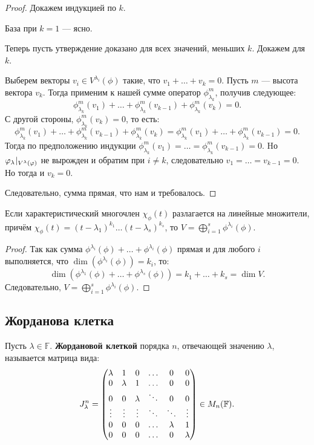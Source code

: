 \begin{proof}
	Докажем индукцией по $k$.
	
	База при $k = 1$ --- ясно.
	
	Теперь пусть утверждение доказано для всех значений, меньших $k$. Докажем для $k$.
	
	Выберем векторы $v_i \in V^{\lambda_i}(\phi)$ такие, что $v_1 + \ldots + v_k = 0$. Пусть $m$ --- высота вектора $v_k$. Тогда применим к нашей сумме оператор $\phi^m_{\lambda_k}$, получив следующее:
	\[
	\phi^m_{\lambda_k}(v_1) + \ldots + \phi^m_{\lambda_k}(v_{k-1}) + \phi^m_{\lambda_k}(v_k) = 0.
	\]
	С другой стороны, $ \phi^m_{\lambda_k}(v_k) = 0$, то есть:
	\[
	\phi^m_{\lambda_k}(v_1) + \ldots + \phi^m_{\lambda_k}(v_{k-1}) + \phi^m_{\lambda_k}(v_k) = \phi^m_{\lambda_k}(v_1) + \ldots + \phi^m_{\lambda_k}(v_{k-1}) = 0.
	\]
	Тогда по предположению индукции $\phi^m_{\lambda_k}(v_1) = \ldots = \phi^m_{\lambda_k}(v_{k-1}) = 0$. Hо
	$ {\varphi_\lambda}\negmedspace\mid_{V^\lambda(\varphi)}$ не вырожден и обратим при $i \neq k$, следовательно $v_1 = \ldots = v_{k-1} = 0$. Но тогда и $v_k = 0$. 
	
	Следовательно, сумма прямая, что нам и требовалось.
\end{proof}

\begin{Theorem}
	Если характеристический многочлен $\chi_\phi(t)$ разлагается на линейные множители, причём $\chi_\phi(t) = (t - \lambda_1)^{k_1}\ldots(t - \lambda_s)^{k_s}$, то $V = \bigoplus_{i = 1}^s  \phi^{\lambda_i}(\phi)$.
\end{Theorem}

\begin{proof}
	Так как сумма $ \phi^{\lambda_i}(\phi) + \ldots +  \phi^{\lambda_i}(\phi)$ прямая и для любого $i$ выполняется, что $\dim(\phi^{\lambda_i}(\phi)) = k_i$, то: 
	$$
	\dim(\phi^{\lambda_1}(\phi) + \ldots +  \phi^{\lambda_s}(\phi)) = k_1 + \ldots + k_s = \dim{V}.
	$$
	Следовательно, $V = \bigoplus_{i = 1}^s  \phi^{\lambda_i}(\phi)$.
\end{proof}

\subsection{Жорданова клетка}
\begin{Def}
Пусть $\lambda \in \mathbb{F}$. \textbf{Жордановой клеткой} порядка $n$, отвечающей значению $\lambda$, называется матрица вида:
\begin{gather*}
J_\lambda^n = 
\begin{pmatrix}
\lambda & 1 & 0 & \ldots & 0 & 0 \\
0 & \lambda & 1 & \ldots & 0 & 0 \\
0 & 0 & \lambda & \ddots & 0 & 0 \\
\vdots & \vdots & \vdots & \ddots & \ddots & \vdots \\
0 & 0 & 0 & \ldots & \lambda & 1 \\
0 & 0 & 0 & \ldots & 0 & \lambda
\end{pmatrix} \in M_n(\mathbb{F}).
\end{gather*}
\end{Def}

